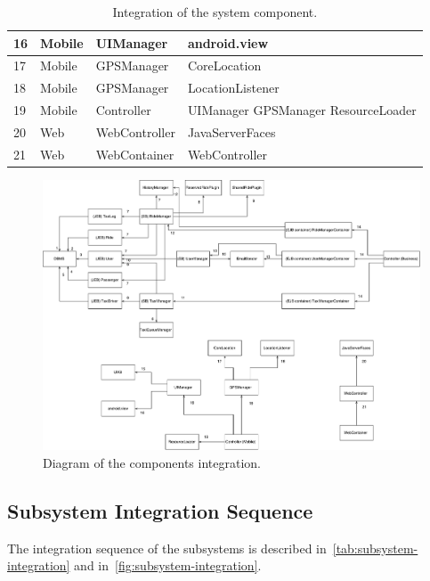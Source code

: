 \begin{table}
\begin{small}
\begin{tabular}{| l | l | p{} | p{} |}
    \hline
    16  & Mobile & UIManager & android.view\\
    \hline
    17  & Mobile & GPSManager & CoreLocation\\
    \hline
    18  & Mobile & GPSManager & LocationListener\\
    \hline
    19  & Mobile & Controller & UIManager \newline GPSManager \newline ResourceLoader\\
    \hline
    20  & Web & WebController & JavaServerFaces\\
    \hline
    21 & Web & WebContainer & WebController\\
    \hline
    \end{tabular}
    \end{small}
    \caption{Integration of the system component.}
    \label{tab:components-integration}
\end{table}

\begin{figure}
    \centering
    \includegraphics[width=\textwidth]{figures/components_integration.pdf}
    \caption{Diagram of the components integration.}
    \label{fig:components-integration}
\end{figure}

\subsection{Subsystem Integration Sequence}
The integration sequence of the subsystems is described in~\autoref{tab:subsystem-integration} and in~\autoref{fig:subsystem-integration}.


